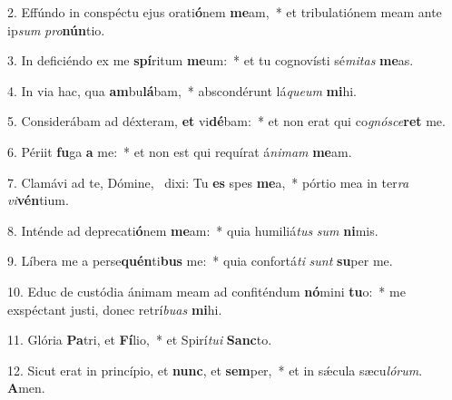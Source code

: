 2. Effúndo in conspéctu ejus orati\textbf{ó}nem \textbf{me}am,~*  et tribulatiónem meam ante ip\textit{sum} \textit{pro}\textbf{nún}tio.\

3. In deficiéndo ex me \textbf{spí}ritum \textbf{me}um:~*  et tu cognovísti sé\textit{mi}\textit{tas} \textbf{me}as.\

4. In via hac, qua \textbf{am}bu\textbf{lá}bam,~*  abscondérunt lá\textit{que}\textit{um} \textbf{mi}hi.\

5. Considerábam ad déxteram, \textbf{et} vi\textbf{dé}bam:~*  et non erat qui co\textit{gnó}\textit{sce}\textbf{ret} me.\

6. Périit \textbf{fu}ga \textbf{a} me:~*  et non est qui requírat á\textit{ni}\textit{mam} \textbf{me}am.\

7. Clamávi ad te, Dómine, \dag\  dixi: Tu \textbf{es} spes \textbf{me}a,~*  pórtio mea in ter\textit{ra} \textit{vi}\textbf{vén}tium.\

8. Inténde ad deprecati\textbf{ó}nem \textbf{me}am:~*  quia humiliá\textit{tus} \textit{sum} \textbf{ni}mis.\

9. Líbera me a perse\textbf{quén}ti\textbf{bus} me:~*  quia confortá\textit{ti} \textit{sunt} \textbf{su}per me.\

10. Educ de custódia ánimam meam ad confiténdum \textbf{nó}mini \textbf{tu}o:~*  me exspéctant justi, donec retrí\textit{bu}\textit{as} \textbf{mi}hi.\

11. Glória \textbf{Pa}tri, et \textbf{Fí}lio,~*  et Spirí\textit{tu}\textit{i} \textbf{Sanc}to.\

12. Sicut erat in princípio, et \textbf{nunc}, et \textbf{sem}per,~*  et in sǽcula sæcu\textit{ló}\textit{rum}. \textbf{A}men.\

